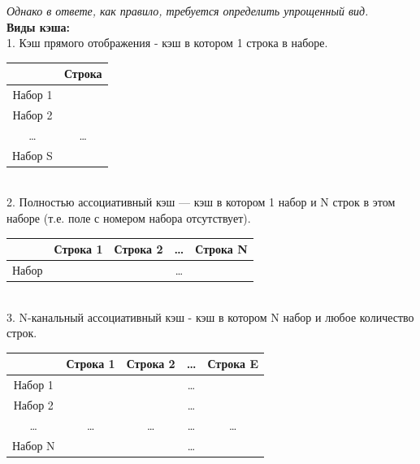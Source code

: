 \documentclass[12pt, letterpaper]{article}
\begin{document}
\textit{Однако в ответе, как правило, требуется определить упрощенный вид.}\\

\textbf{Виды кэша:}\\
1. Кэш прямого отображения - кэш в котором 1 строка в наборе.\\

\begin{minipage}{.35\textwidth}
    \begin{tabular}{||c||c||}
        \hline
        & Строка\\
        \hline
        \hline
        Набор 1 & \\
        \hline
        \hline
        Набор 2 & \\
        \hline
        \hline
        \dots & \dots \\
        \hline
        \hline
        Набор S & \\
        \hline
        \hline
    \end{tabular}
\end{minipage}\\

2. Полностью ассоциативный кэш — кэш в котором 1 набор и N строк в этом наборе (т.е. поле с номером набора отсутствует).\\

\begin{minipage}{.2\textwidth}
    \begin{tabular}{||c||c||c||c||c||}
        \hline
        & Строка 1 & Строка 2 & \dots & Строка N\\
        \hline
        \hline
        Набор & & & \dots&\\
        \hline
        \hline
    \end{tabular}
\end{minipage}\\

3. N-канальный ассоциативный кэш - кэш в котором N набор и любое количество строк.\\
\begin{minipage}{.2\textwidth}
    \begin{tabular}{||c||c||c||c||c||}
        \hline
        & Строка 1 & Строка 2 & \dots & Строка E\\
        \hline
        \hline
        Набор 1 & & & \dots&\\
        \hline
        \hline
        Набор 2 & & & \dots&\\
        \hline
        \hline
        \dots & \dots& \dots& \dots&\dots\\
        \hline
        \hline
        Набор N & & & \dots&\\
        \hline
        \hline
    \end{tabular}
\end{minipage}\\
\end{document}

